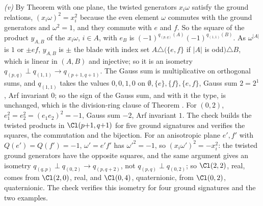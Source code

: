 \emph{(v)} By Theorem  with one plane, the twisted generators $x_{i}\omega$ satisfy the ground relations, $(x_{i}\omega)^{2} = x_{i}^{2}$ because the even element $\omega$ commutes with the ground generators and $\omega^{2} = 1$, and they commute with $e$ and $f$. So the square of the product $y_{A,B}$ of the $x_{i}\omega$, $i \in A$, with $e_{B}$ is $(-1)^{q_{(p,q)}(A)}(-1)^{q_{(1,1)}(B)}$. As $\omega^{|A|}$ is $1$ or $\pm ef$, $y_{A,B}$ is $\pm$ the blade with index set $A \triangle (\{e, f\}$ if $|A|$ is odd$) \triangle B$, which is linear in $(A, B)$ and injective; so it is an isometry $q_{(p,q)} \perp q_{(1,1)} \to q_{(p+1,q+1)}$. The Gauss sum is multiplicative on orthogonal sums, and $q_{(1,1)}$ takes the values $0, 0, 1, 0$ on $\emptyset, \{e\}, \{f\}, \{e,f\}$, Gauss sum $2 = 2^{1}$, Arf invariant $0$; so the sign of the Gauss sum, and with it the type, is unchanged, which is the division-ring clause of Theorem . For $(0,2)$, $e_{1}^{2} = e_{2}^{2} = (e_{1}e_{2})^{2} = -1$, Gauss sum $-2$, Arf invariant $1$. The check builds the twisted products in $\Cl(p{+}1, q{+}1)$ for five ground signatures and verifies the squares, the commutation and the bijection. For an anisotropic plane $e', f'$ with $Q(e') = Q(f') = -1$, $\omega' = e'f'$ has $\omega'^{2} = -1$, so $(x_{i}\omega')^{2} = -x_{i}^{2}$: the twisted ground generators have the opposite squares, and the same argument gives an isometry $q_{(q,p)} \perp q_{(0,2)} \to q_{(p,q+2)}$, not $q_{(p,q)} \perp q_{(0,2)}$; so $\Cl(2,2)$, real, comes from $\Cl(2,0)$, real, and $\Cl(0,4)$, quaternionic, from $\Cl(0,2)$, quaternionic. The check verifies this isometry for four ground signatures and the two examples.
